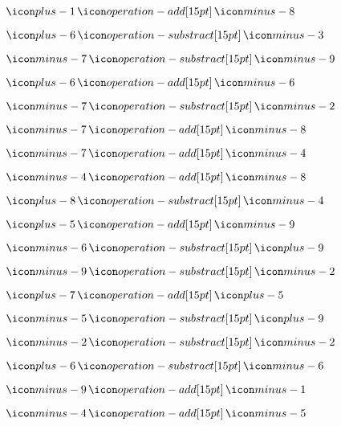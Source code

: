 {{\item$\one \plus \meight$

\item$\six \minus \mthree$

\item$\mseven \minus \mnine$

\item$\six \plus \msix$

\item$\mseven \minus \mtwo$

\item$\mseven \plus \meight$

\item$\mseven \plus \mfour$

\item$\mfour \plus \meight$

\item$\eight \minus \mfour$

\item$\five \plus \mnine$

\item$\msix \minus \nine$

\item$\mnine \minus \mtwo$

\item$\seven \plus \five$

\item$\mfive \minus \nine$

\item$\mtwo \minus \mtwo$

\item$\six \minus \msix$

\item$\mnine \plus \mone$

\item$\mfour \plus \mfive$

}}

\newpage

